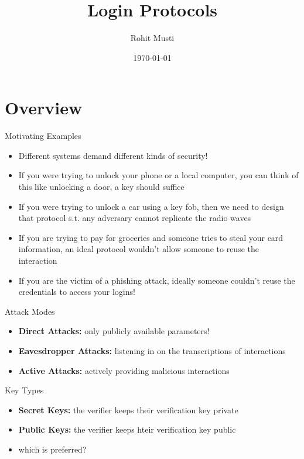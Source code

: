 \documentclass[handout]{beamer}
\title{Login Protocols}
\author{Rohit Musti}
\institute{CUNY - Hunter College}
\date{\today}
\begin{document}
 
\frame{\titlepage}

\section{Overview}

\begin{frame}{Motivating Examples}
  \begin{itemize}
    \item \pause Different systems demand different kinds of security!
    \item \pause If you were trying to unlock your phone or a local computer, you can think of this like unlocking a door, a key should suffice
    \item \pause If you were trying to unlock a car using a key fob, then we need to design that protocol s.t. any adversary cannot replicate the radio waves
    \item \pause If you are trying to pay for groceries and someone tries to steal your card information, an ideal protocol wouldn't allow someone to reuse the interaction
    \item \pause If you are the victim of a phishing attack, ideally someone couldn't reuse the credentials to access your logins! 
  \end{itemize} 
\end{frame}

\begin{frame}{Attack Modes}
  \begin{itemize}
    \item \pause \textbf{Direct Attacks:} only publicly available parameters!
    \item \pause \textbf{Eavesdropper Attacks:} listening in on the transcriptions of interactions
    \item \pause \textbf{Active Attacks:} actively providing malicious interactions
  \end{itemize} 
\end{frame}

\begin{frame}{Key Types}
  \begin{itemize}
    \item \pause \textbf{Secret Keys:} the verifier keeps their verification key private
    \item \pause \textbf{Public Keys:} the verifier keeps hteir verification key public
    \item \pause which is preferred?
  \end{itemize} 
\end{frame}
\end{document}
